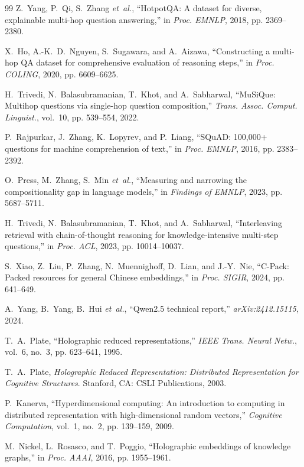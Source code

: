 \documentclass[conference]{IEEEtran}
\begin{document}
\begin{thebibliography}{99}
Z.~Yang, P.~Qi, S.~Zhang \emph{et~al.},
``{HotpotQA}: A dataset for diverse, explainable multi-hop question
answering,'' in \emph{Proc. EMNLP}, 2018, pp. 2369--2380.

X.~Ho, A.-K.~D.~Nguyen, S.~Sugawara, and A.~Aizawa,
``Constructing a multi-hop {QA} dataset for comprehensive evaluation of
reasoning steps,'' in \emph{Proc. COLING}, 2020, pp. 6609--6625.

H.~Trivedi, N.~Balasubramanian, T.~Khot, and A.~Sabharwal,
``{MuSiQue}: Multihop questions via single-hop question composition,''
\emph{Trans. Assoc. Comput. Linguist.}, vol.~10, pp. 539--554, 2022.

P.~Rajpurkar, J.~Zhang, K.~Lopyrev, and P.~Liang,
``{SQuAD}: 100,000+ questions for machine comprehension of text,''
in \emph{Proc. EMNLP}, 2016, pp. 2383--2392.

O.~Press, M.~Zhang, S.~Min \emph{et~al.},
``Measuring and narrowing the compositionality gap in language models,''
in \emph{Findings of EMNLP}, 2023, pp. 5687--5711.

H.~Trivedi, N.~Balasubramanian, T.~Khot, and A.~Sabharwal,
``Interleaving retrieval with chain-of-thought reasoning for
knowledge-intensive multi-step questions,''
in \emph{Proc. ACL}, 2023, pp. 10014--10037.

S.~Xiao, Z.~Liu, P.~Zhang, N.~Muennighoff, D.~Lian, and J.-Y.~Nie,
``C-Pack: Packed resources for general Chinese embeddings,''
in \emph{Proc. SIGIR}, 2024, pp. 641--649.

A.~Yang, B.~Yang, B.~Hui \emph{et~al.},
``{Qwen2.5} technical report,''
\emph{arXiv:2412.15115}, 2024.

T.~A.~Plate,
``Holographic reduced representations,''
\emph{IEEE Trans. Neural Netw.}, vol.~6, no.~3, pp. 623--641, 1995.

T.~A.~Plate,
\emph{Holographic Reduced Representation: Distributed Representation for
Cognitive Structures}. Stanford, CA: CSLI Publications, 2003.

P.~Kanerva,
``Hyperdimensional computing: An introduction to computing in distributed
representation with high-dimensional random vectors,''
\emph{Cognitive Computation}, vol.~1, no.~2, pp. 139--159, 2009.

M.~Nickel, L.~Rosasco, and T.~Poggio,
``Holographic embeddings of knowledge graphs,''
in \emph{Proc. AAAI}, 2016, pp. 1955--1961.

\end{thebibliography}
\end{document}

